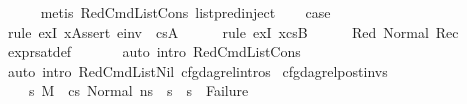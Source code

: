 \begin{isabellebody}
\ \ \ \ \isamarkupfalse%
\ {\isacharparenleft}{\kern0pt}metis\ RedCmdListCons\ list{\isachardot}{\kern0pt}pred{\isacharunderscore}{\kern0pt}inject{\isacharparenleft}{\kern0pt}{}{\isacharparenright}{\kern0pt}{\isacharparenright}{\kern0pt}\isanewline
\ \ \isamarkupfalse%
\ {\isacharquery}{\kern0pt}case\isanewline
\ \ \ \ \isamarkupfalse%
\ {\isacharparenleft}{\kern0pt}rule\ exI{\isacharbrackleft}{\kern0pt}\ {\isacharquery}{\kern0pt}x{\isacharequal}{\kern0pt}{\isachardoublequoteopen}Assert\ e{\isacharunderscore}{\kern0pt}inv\ {\isacharhash}{\kern0pt}\ cs{}A{\isachardoublequoteclose}{\isacharbrackright}{\kern0pt}{\isacharparenright}{\kern0pt}\isanewline
\ \ \ \ \isamarkupfalse%
\ {\isacharparenleft}{\kern0pt}rule\ exI{\isacharbrackleft}{\kern0pt}\ {\isacharquery}{\kern0pt}x{\isacharequal}{\kern0pt}cs{}B{\isacharbrackright}{\kern0pt}{\isacharparenright}{\kern0pt}\isanewline
\ \ \ \ \isamarkupfalse%
\ Red{}\ Normal\ Rec\ \isanewline
\ \ \ \ \isamarkupfalse%
\ expr{\isacharunderscore}{\kern0pt}sat{\isacharunderscore}{\kern0pt}def\ \isanewline
\ \ \ \ \isamarkupfalse%
\ {\isacharparenleft}{\kern0pt}auto\ intro{\isacharcolon}{\kern0pt}\ RedCmdListCons{\isacharparenright}{\kern0pt}\isanewline
{}\isamarkupfalse%
\ {\isacharparenleft}{\kern0pt}auto\ intro{\isacharcolon}{\kern0pt}\ RedCmdListNil\ cfg{\isacharunderscore}{\kern0pt}dag{\isacharunderscore}{\kern0pt}rel{\isachardot}{\kern0pt}intros{\isacharparenright}{\kern0pt}%
\endisatagproof
{\isafoldproof}%
%
\isadelimproof
\isanewline
%
\endisadelimproof
\isanewline
{}\isamarkupfalse%
\ cfg{\isacharunderscore}{\kern0pt}dag{\isacharunderscore}{\kern0pt}rel{\isacharunderscore}{\kern0pt}post{\isacharunderscore}{\kern0pt}invs{\isacharunderscore}{\kern0pt}{}{\isacharcolon}{\kern0pt}\isanewline
\ \ \ {\isachardoublequoteopen}{\isasymAnd}\ s{}{\isacharprime}{\kern0pt}{\isachardot}{\kern0pt}\ M{\isacharcomma}{\kern0pt}{\isasymLambda}{\isacharcomma}{\kern0pt}{\isasymGamma}{\isacharcomma}{\kern0pt}{\isasymOmega}\ {\isasymturnstile}\ {\isasymlangle}cs{}{\isacharcomma}{\kern0pt}\ Normal\ ns{\isasymrangle}\ {\isacharbrackleft}{\kern0pt}{\isasymrightarrow}{\isacharbrackright}{\kern0pt}\ s{}{\isacharprime}{\kern0pt}\ {\isasymLongrightarrow}\ s{}{\isacharprime}{\kern0pt}\ {\isasymnoteq}\ Failure{\isachardoublequoteclose}\ \isanewline

\end{isabellebody}
